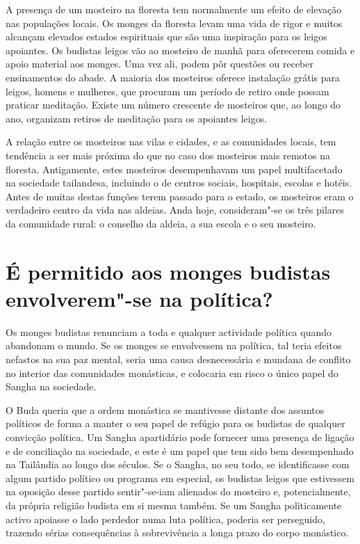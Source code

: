 A presença de um mosteiro na floresta tem normalmente um efeito de
elevação nas populações locais. Os monges da floresta levam uma vida de
rigor e muitos alcançam elevados estados espirituais que são uma
inspiração para os leigos apoiantes. Os budistas leigos vão ao mosteiro
de manhã para oferecerem comida e apoio material aos monges. Uma vez
ali, podem pôr questões ou receber ensinamentos do abade. A maioria dos
mosteiros oferece instalação grátis para leigos, homens e mulheres, que
procuram um período de retiro onde possam praticar meditação. Existe um
número crescente de mosteiros que, ao longo do ano, organizam retiros de
meditação para os apoiantes leigos.

A relação entre os mosteiros nas vilas e cidades, e as comunidades
locais, tem tendência a ser mais próxima do que no caso dos mosteiros
mais remotos na floresta. Antigamente, estes mosteiros desempenhavam um
papel multifacetado na sociedade tailandesa, incluindo o de centros
sociais, hospitais, escolas e hotéis. Antes de muitas destas funções
terem passado para o estado, os mosteiros eram o verdadeiro centro da
vida nas aldeias. Anda hoje, consideram"-se os três pilares da comunidade
rural: o conselho da aldeia, a sua escola e o seu mosteiro.

\section{É permitido aos monges budistas envolverem"-se na política?}

Os monges budistas renunciam a toda e qualquer actividade política
quando abandonam o mundo. Se os monges se envolvessem na política, tal
teria efeitos nefastos na sua paz mental, seria uma causa desnecessária
e mundana de conflito no interior das comunidades monásticas, e
colocaria em risco o único papel do Sangha na sociedade.

O Buda queria que a ordem monástica se mantivesse distante dos assuntos
políticos de forma a manter o seu papel de refúgio para os budistas de
qualquer convicção política. Um Sangha apartidário pode fornecer uma
presença de ligação e de conciliação na sociedade, e este é um papel que
tem sido bem desempenhado na Tailândia ao longo dos séculos. Se o
Sangha, no seu todo, se identificasse com algum partido político ou
programa em especial, os budistas leigos que estivessem na oposição
desse partido sentir"-se-iam alienados do mosteiro e, potencialmente, da
própria religião budista em si mesma também. Se um Sangha
politicamente activo apoiasse o lado perdedor numa luta política, poderia
ser perseguido, trazendo sérias consequências à sobrevivência a longa
prazo do corpo monástico.

